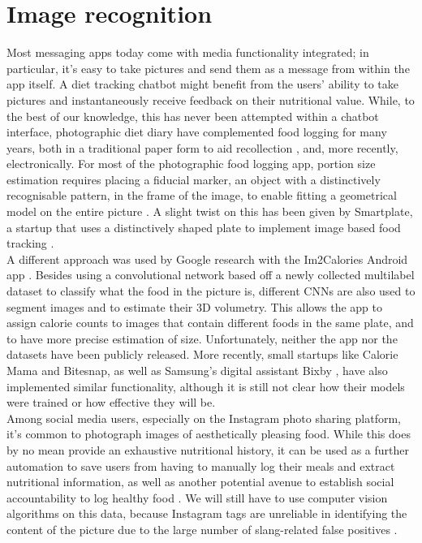 \section{Image recognition}
Most messaging apps today come with media functionality integrated; in particular, it's easy to take pictures and send them as a message from within the app itself. A diet tracking chatbot might benefit from the users' ability to take pictures and instantaneously receive feedback on their nutritional value. While, to the best of our knowledge, this has never been attempted within a chatbot interface, photographic diet diary have complemented food logging for many years, both in a traditional paper form to aid recollection \cite{Higgins2009}, and, more recently, electronically. For most of the photographic food logging app, portion size estimation requires placing a fiducial marker, an object with a distinctively recognisable pattern, in the frame of the image, to enable fitting a geometrical model on the entire picture \cite{Ahmad2016}. A slight twist on this has been given by Smartplate, a startup that uses a distinctively shaped plate to implement image based food tracking \cite{smartplate}.\\
A different approach was used by Google research with the Im2Calories Android app \cite{Myers2015}. Besides using a convolutional network based off a newly collected multilabel dataset to classify what the food in the picture is, different CNNs are also used to segment images and to estimate their 3D volumetry. This allows the app to assign calorie counts to images that contain different foods in the same plate, and to have more precise estimation of size. Unfortunately, neither the app nor the datasets have been publicly released. More recently, small startups like Calorie Mama\cite{caloriemamaai} and Bitesnap\cite{bitesnap}, as well as Samsung's digital assistant Bixby \cite{bixbyarticle}, have also implemented similar functionality, although it is still not clear how their models were trained or how effective they will be. \\
Among social media users, especially on the Instagram photo sharing platform, it's common to photograph images of aesthetically pleasing food. While this does by no mean provide an exhaustive nutritional history, it can be used as a further automation to save users from having to manually log their meals and extract nutritional information, as well as another potential avenue to establish social accountability to log healthy food \cite{Sharma:2015:MCN:2740908.2742754}. We will still have to use computer vision algorithms on this data, because Instagram tags are unreliable in identifying the content of the picture due to the large number of slang-related false positives \cite{hospedales2016}.
